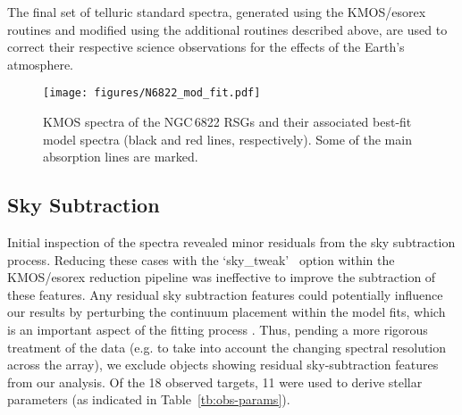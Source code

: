 \documentclass[iop]{emulateapj}
\begin{document}
The final set of telluric standard spectra,
generated using the KMOS/esorex routines and modified using the additional routines described above,
are used to correct their respective science observations for the effects of the Earth's atmosphere.



\begin{figure*}
 \begin{center}
\texttt{[image: figures/N6822\_mod\_fit.pdf]}
\caption{KMOS spectra of the NGC\,6822 RSGs and their associated best-fit model spectra
(black and red lines, respectively).
Some of the main absorption lines are marked.
         }
\label{fig:model_fits}
\end{center}
\end{figure*}

\subsection{Sky Subtraction} %
\label{sub:sky_subtraction}

Initial inspection of the spectra revealed minor residuals from the sky subtraction process.
Reducing these cases with the \textquoteleft sky\_tweak\textquoteright
~option within the KMOS/esorex reduction pipeline was ineffective to improve the subtraction of these features.
Any residual sky subtraction features could potentially influence our results by perturbing the continuum placement within the model fits, which is an important aspect of the fitting process
\citep[see][for more discussion]{Davies-prep,2014ApJ...788...58G}.
Thus, pending a more rigorous treatment of the data
(e.g. to take into account the changing spectral resolution across the array),
we exclude objects showing residual sky-subtraction features from our analysis.
Of the 18 observed targets, 11 were used to derive stellar parameters
(as indicated in Table~\ref{tb:obs-params}).




\end{document}
